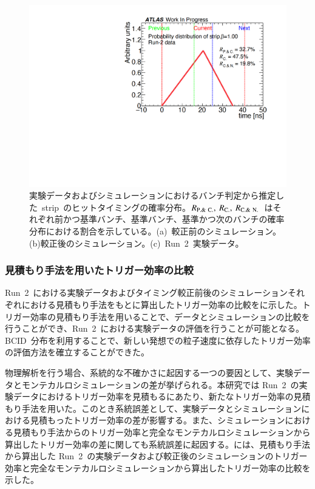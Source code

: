 \begin{figure}[H]
\begin{minipage}{0.33\hsize}
    \subcaption{}
    \end{minipage}
    \begin{minipage}{0.33\hsize}
    \centering   
    \includegraphics[width=\textwidth,page=1]{img/rec/rec_data_s.pdf}
    \subcaption{}
    \end{minipage} 
    \caption[実験データおよびシミュレーションにおけるバンチ判定から推定した~strip~のヒットタイミングの確率分布]{実験データおよびシミュレーションにおけるバンチ判定から推定した~strip~のヒットタイミングの確率分布。$R_{\rm{P.\&~C.}},~R_{\rm{C.}},~R_{\rm{C.\&~N.}}$~はそれぞれ前かつ基準バンチ、基準バンチ、基準かつ次のバンチの確率分布における割合を示している。(a)~較正前のシミュレーション。(b)較正後のシミュレーション。(c)~Run~2~実験データ。}\label{fig:recall1}
\end{figure}

\subsubsection{見積もり手法を用いたトリガー効率の比較}
Run~2~における実験データおよびタイミング較正前後のシミュレーションそれぞれにおける見積もり手法をもとに算出したトリガー効率の比較をに示した。トリガー効率の見積もり手法を用いることで、データとシミュレーションの比較を行うことができ、Run~2~における実験データの評価を行うことが可能となる。BCID~分布を利用することで、新しい発想での粒子速度に依存したトリガー効率の評価方法を確立することができた。

物理解析を行う場合、系統的な不確かさに起因する一つの要因として、実験データとモンテカルロシミュレーションの差が挙げられる。本研究では Run~2~の実験データにおけるトリガー効率を見積もるにあたり、新たなトリガー効率の見積もり手法を用いた。このとき系統誤差として、実験データとシミュレーションにおける見積もったトリガー効率の差が影響する。また、シミュレーションにおける見積もり手法からのトリガー効率と完全なモンテカルロシミュレーションから算出したトリガー効率の差に関しても系統誤差に起因する。には、見積もり手法から算出した Run~2~の実験データおよび較正後のシミュレーションのトリガー効率と完全なモンテカルロシミュレーションから算出したトリガー効率の比較を示した。

